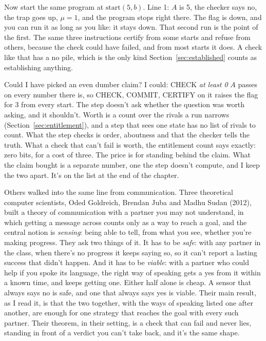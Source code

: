 \documentclass[11pt,twoside]{article}
\theoremstyle{thielethm}
\theoremstyle{thieledef}
\theoremstyle{thieledef}
\theoremstyle{thieledef}
\theoremstyle{thielethm}
\theoremstyle{thieleobs}
\theoremstyle{thielethm}
\begin{document}
Now start the same program at $\mathrm{start}(5, b)$. Line 1: $A$ is 5, the checker says no,
the trap goes up, $\mu = 1$, and the program stops right there. The flag is down, and you can
run it as long as you like: it stays down. That second run is the point of the first. The same
three instructions certify from some starts and refuse from others, because the check could
have failed, and from most starts it does. A check like that has a no pile, which is the only
kind Section~\ref{sec:established} counts as establishing anything.

Could I have picked an even dumber claim? I could: CHECK \emph{at least 0} $A$ passes on every
number there is, so CHECK, COMMIT, CERTIFY on it raises the flag for 3 from every start. The step
doesn't ask whether the question was worth asking, and it shouldn't. Worth is a count over the
rivals a run narrows (Section~\ref{sec:entitlement}), and a step that sees one state has no list
of rivals to count. What the step checks is order, aboutness and that the checker tells the
truth. What a check that can't fail is worth, the entitlement count says exactly: zero bits, for
a cost of three. The price is for standing behind the claim. What the claim bought is a separate
number, one the step doesn't compute, and I keep the two apart. It's on the list at the end of the chapter.

Others walked into the same line from communication. Three theoretical computer scientists,
Oded Goldreich, Brendan Juba and Madhu Sudan
(2012), built a theory of communication with a partner you may not understand, in which getting a
message across counts only as a way to reach a goal, and the central notion is \emph{sensing}: being able to tell, from what you see,
whether you're making progress. They ask two things of it. It has to be \emph{safe}: with any
partner in the class, when there's no progress it keeps saying so, so it can't report a lasting
success that didn't happen. And it has to be \emph{viable}: with a partner who could help if you
spoke its language, the right way of speaking gets a yes from it within a known time, and keeps
getting one. Either half alone is cheap. A sensor that always says no is safe, and one that always
says yes is viable. Their main result, as I read it, is that the two together, with the ways of
speaking listed one after another, are enough for one strategy that reaches the goal with every
such partner. Their theorem, in their setting, is a check that can fail and never lies,
standing in front of a verdict you can't take back, and
it's the same shape.
\end{document}

